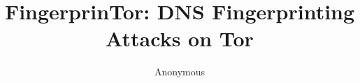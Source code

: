 \documentclass[conference]{IEEEtran}
\begin{document}
\title{FingerprinTor: DNS Fingerprinting Attacks on Tor}

\author{Anonymous}


\maketitle





















% 

\balance



\newpage

\end{document}
